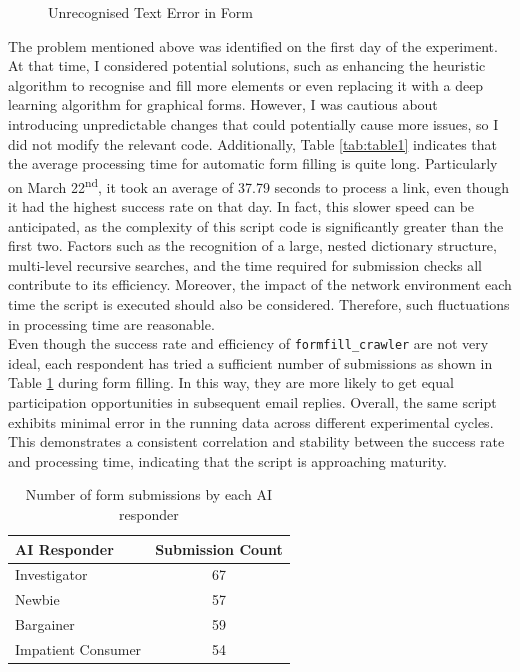 \documentclass[ oneside,%
                    author={Cassie Qing Tang},
                    degree={BSc},
                     title={An Automated Response System for Disrupting Online Pet Scamming \\ },
                    subtitle={ }]{dissertation}
\begin{document}
\begin{figure}[H]
\begin{minipage}{0.45\textwidth}
        \caption{Unrecognised Text Error in Form}
        \label{fig:pic11}
    \end{minipage}
\end{figure}

The problem mentioned above was identified on the first day of the experiment. At that time, I considered potential solutions, such as enhancing the heuristic algorithm to recognise and fill more elements or even replacing it with a deep learning algorithm for graphical forms. However, I was cautious about introducing unpredictable changes that could potentially cause more issues, so I did not modify the relevant code. Additionally, Table \ref{tab:table1} indicates that the average processing time for automatic form filling is quite long. Particularly on March 22\textsuperscript{nd}, it took an average of 37.79 seconds to process a link, even though it had the highest success rate on that day. In fact, this slower speed can be anticipated, as the complexity of this script code is significantly greater than the first two. Factors such as the recognition of a large, nested dictionary structure, multi-level recursive searches, and the time required for submission checks all contribute to its efficiency. Moreover, the impact of the network environment each time the script is executed should also be considered. Therefore, such fluctuations in processing time are reasonable.
\\

Even though the success rate and efficiency of \texttt{formfill\_crawler} are not very ideal, each respondent has tried a sufficient number of submissions as shown in Table \ref{tab:table2} during form filling. In this way, they are more likely to get equal participation opportunities in subsequent email replies. Overall, the same script exhibits minimal error in the running data across different experimental cycles. This demonstrates a consistent correlation and stability between the success rate and processing time, indicating that the script is approaching maturity.
\begin{table}[ht]
\centering
\label{tab:ai_messages}
\begin{tabular}{@{}lc@{}}
\toprule
\textbf{AI Responder} & \textbf{Submission Count} \\
\midrule
Investigator & 67 \\
Newbie & 57 \\
Bargainer & 59 \\
Impatient Consumer & 54 \\
\bottomrule
\end{tabular}
\caption{Number of form submissions by each AI responder}
\label{tab:table2}
\end{table}
\end{document}
